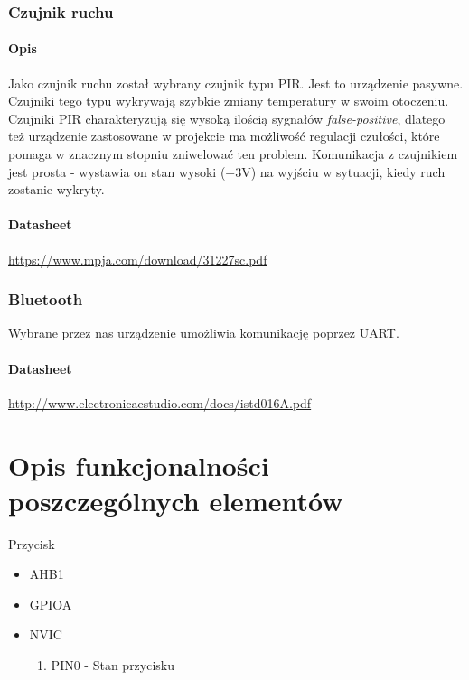 \documentclass{article}
\begin{document}
\subsubsection{Czujnik ruchu}

\paragraph{Opis}
Jako czujnik ruchu został wybrany czujnik typu PIR. Jest to urządzenie pasywne.
Czujniki tego typu wykrywają szybkie zmiany temperatury w swoim otoczeniu. Czujniki
PIR charakteryzują się wysoką ilością sygnałów \emph{false-positive}, dlatego też
urządzenie zastosowane w projekcie ma możliwość regulacji czułości, które pomaga
w znacznym stopniu zniwelować ten problem. Komunikacja z czujnikiem jest prosta - wystawia
on stan wysoki (+3V) na wyjściu w sytuacji, kiedy ruch zostanie wykryty.

\paragraph{Datasheet}
\url{https://www.mpja.com/download/31227sc.pdf}

\subsubsection{Bluetooth}
Wybrane przez nas urządzenie umożliwia komunikację poprzez UART.

\paragraph{Datasheet}
\url{http://www.electronicaestudio.com/docs/istd016A.pdf}

\section{Opis funkcjonalności poszczególnych elementów}

Przycisk
\begin{itemize}
    \item AHB1
    \item GPIOA
    \item NVIC
    \begin{enumerate}
        \item PIN0 - Stan przycisku
    \end{enumerate}
\end{itemize}
\end{document}
